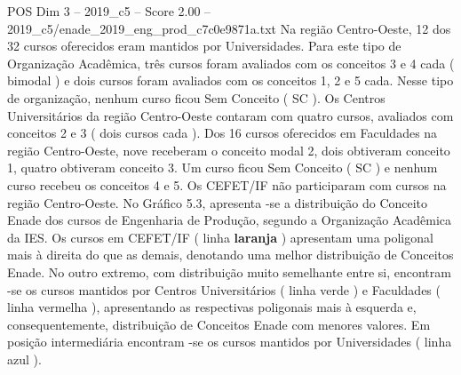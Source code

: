 \begin{textsample}{POS Dim 3 – 2019\_c5 – Score 2.00 – 2019\_c5/enade\_2019\_eng\_prod\_c7c0e9871a.txt}
Na região Centro-Oeste, 12 dos 32 cursos oferecidos eram mantidos por Universidades.
Para este tipo de Organização Acadêmica, três cursos foram avaliados com os conceitos 3 e 4 cada ( bimodal ) e dois cursos foram avaliados com os conceitos 1, 2 e 5 cada.
Nesse tipo de organização, nenhum curso ficou Sem Conceito ( SC ).
Os Centros Universitários da região Centro-Oeste contaram com quatro cursos, avaliados com conceitos 2 e 3 ( dois cursos cada ).
Dos 16 cursos oferecidos em Faculdades na região Centro-Oeste, nove receberam o conceito modal 2, dois obtiveram conceito 1, quatro obtiveram conceito 3.
Um curso ficou Sem Conceito ( SC ) e nenhum curso recebeu os conceitos 4 e 5.
Os CEFET/IF não participaram com cursos na região Centro-Oeste.
No Gráfico 5.3, apresenta -se a distribuição do Conceito Enade dos cursos de Engenharia de Produção, segundo a Organização Acadêmica da IES.
Os cursos em CEFET/IF ( linha \textbf{laranja} ) apresentam uma poligonal mais à direita do que as demais, denotando uma melhor distribuição de Conceitos Enade.
No outro extremo, com distribuição muito semelhante entre si, encontram -se os cursos mantidos por Centros Universitários ( linha verde ) e Faculdades ( linha vermelha ), apresentando as respectivas poligonais mais à esquerda e, consequentemente, distribuição de Conceitos Enade com menores valores.
Em posição intermediária encontram -se os cursos mantidos por Universidades ( linha azul ).

\end{textsample}
